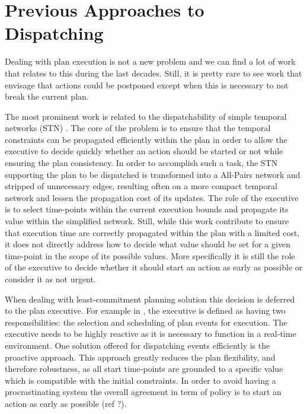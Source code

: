 \section{Previous Approaches to Dispatching}


Dealing with plan execution is not a new problem and we can find a lot
of work that relates to this during the last decades. Still, it is
pretty rare to see work that envisage that actions could be
postponed except when this is necessary to not break the current
plan. 


The most prominent work is related to the dispatchability of simple 
temporal networks (STN) \cite{mus98a}. The core of the problem is to
ensure that the temporal constraints can be propagated efficiently
within the plan in order to allow the executive to decide quickly
whether an action should be started or not while ensuring the plan
consistency. In order to accomplish such a task, the STN supporting
the plan to be dispatched is transformed into a All-Pairs network and
stripped of unnecessary edges, resulting often on a more compact
temporal network and lessen the propagation cost of its updates. The
role of the executive is to select time-points within the current
execution bounds and propagate its value within the simplified
network. Still, while this work contribute to ensure that execution
time are correctly propagated within the plan with a limited cost, it
does not directly address how to decide what value should be set for a
given time-point in the scope of its possible values. More specifically
it is still the role of the executive to decide whether it should
start an action as early as possible or consider it as not urgent. 

When dealing with least-commitment planning solution this decision is
deferred to the plan executive. For example in \cite{mus98c}, the 
executive is defined as having two responsibilities: the selection and scheduling of plan
events for execution. The executive needs to
be highly reactive as it is necessary to function in a real-time
environment. One solution offered for dispatching events efficiently
is the proactive approach. This approach greatly reduces the plan
flexibility, and therefore robustness, as all start time-points are
grounded to a specific value which is compatible with the initial
constraints. In order to avoid having a procrastinating system the
overall agreement in term of policy is to start an action as early as
possible (ref ?). 

